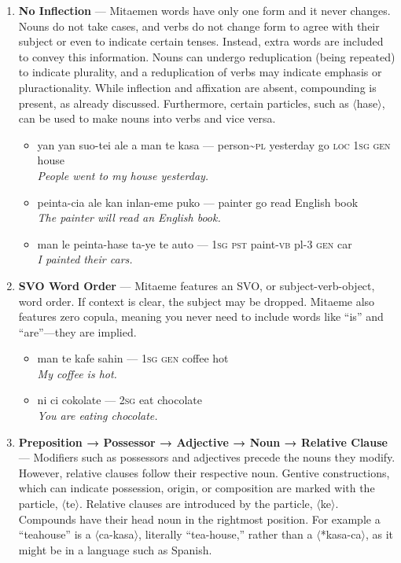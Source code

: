 \documentclass[a4paper]{article}
\begin{document}
\begin{enumerate}
	\item \textbf{No Inflection} — Mitaemen words have only one form and it never changes. Nouns do not take cases, and verbs do not change form to agree with their subject or even to indicate certain tenses. Instead, extra words are included to convey this information. Nouns can undergo reduplication (being repeated) to indicate plurality, and a reduplication of verbs may indicate emphasis or pluractionality. While inflection and affixation are absent, compounding is present, as already discussed.  Furthermore, certain particles, such as $\langle$hase$\rangle$, can be used to make nouns into verbs and vice versa.
	\begin{itemize}
		\item yan yan suo-tei ale a man te kasa — person\textasciitilde{}\textsc{pl} yesterday go \textsc{loc 1sg gen} house\\\textit{People went to my house yesterday.}
		\item peinta-cia ale kan inlan-eme puko — painter go read English book\\\textit{The painter will read an English book.}
		\item man le peinta-hase ta-ye te auto — \textsc{1sg pst} paint-\textsc{vb} pl-3 \textsc{gen} car \\\textit{I painted their cars.}
	\end{itemize}
	\item \textbf{SVO Word Order} — Mitaeme features an SVO, or subject-verb-object, word order. If context is clear, the subject may be dropped. Mitaeme also features zero copula, meaning you never need to include words like ``is'' and ``are''—they are implied.
	\begin{itemize}
		\item man te kafe sahin — \textsc{1sg} \textsc{gen} coffee hot\\\textit{My coffee is hot.}
		\item ni ci cokolate — \textsc{2sg} eat chocolate\\\textit{You are eating chocolate.}
	\end{itemize}
	\item \textbf{ Preposition → Possessor → Adjective → Noun → Relative Clause  } — Modifiers such as possessors and adjectives precede the nouns they modify. However, relative clauses follow their respective noun. Gentive constructions, which can indicate possession, origin, or composition are marked with the particle, $\langle$te$\rangle$. Relative clauses are introduced by the particle, $\langle$ke$\rangle$. Compounds have their head noun in the rightmost position. For example a ``teahouse'' is a $\langle$ca-kasa$\rangle$, literally ``tea-house,'' rather than a $\langle$*kasa-ca$\rangle$, as it might be in a language such as Spanish.

\end{enumerate}
\end{document}
